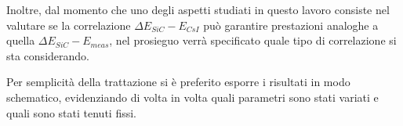 Inoltre, dal momento che uno degli aspetti studiati in questo lavoro consiste nel valutare se la correlazione $\Delta E_{SiC} - E_{CsI}$ può garantire prestazioni analoghe a quella $\Delta E_{SiC} - E_{meas}$, nel prosieguo verrà specificato quale tipo di correlazione si sta considerando.

Per semplicità della trattazione si è preferito esporre i risultati in modo schematico, evidenziando di volta in volta quali parametri sono stati variati e quali sono stati tenuti fissi.

\subsection{}


